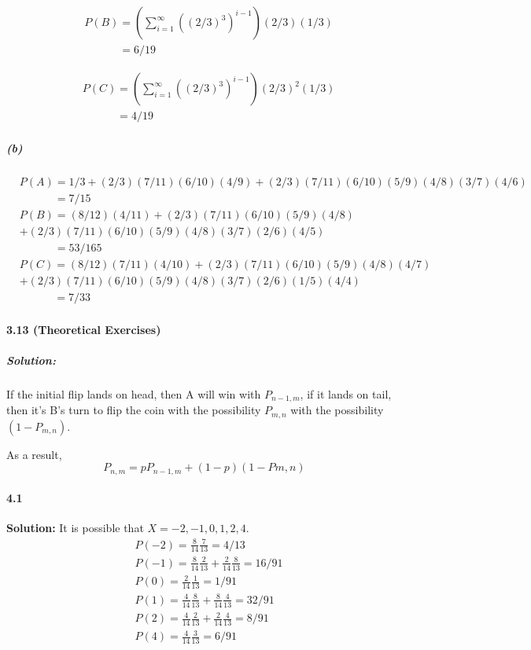 \documentclass[11pt]{article}
\begin{document}
			\begin{align}
				&P(B) = (\sum_{i = 1}^\infty ((2/3)^3)^{i - 1})(2/3)(1/3)\nonumber\\
				&\phantom{P(B)} = 6/19\nonumber
			\end{align}
			
			\begin{align}
				&P(C) = 	(\sum_{i = 1}^\infty ((2/3)^3)^{i - 1})(2/3)^2(1/3)\nonumber\\
				&\phantom{P(C)} = 4/19\nonumber
			\end{align}

		\subparagraph{(b)}
			\begin{align}
				&P(A) = 1/3 + (2/3)(7/11)(6/10)(4/9) + (2/3)(7/11)(6/10)(5/9)(4/8)(3/7)(4/6)\nonumber\\
				&\phantom{P(A)} = 7/15\nonumber\\
				&P(B) = (8/12)(4/11) + (2/3)(7/11)(6/10)(5/9)(4/8)\nonumber\\
				&+ (2/3)(7/11)(6/10)(5/9)(4/8)(3/7)(2/6)(4/5)\nonumber\\
				&\phantom{P(B)} = 53/165\nonumber\\
				&P(C) = (8/12)(7/11)(4/10) + (2/3)(7/11)(6/10)(5/9)(4/8)(4/7)\nonumber\\
				& + (2/3)(7/11)(6/10)(5/9)(4/8)(3/7)(2/6)(1/5)(4/4)\nonumber\\
				&\phantom{P(C)} = 7/33\nonumber
			\end{align}
	\paragraph{3.13 (Theoretical Exercises)}
		\subparagraph{Solution:}
			If the initial flip lands on head, then A will win with $P_{n - 1, m}$, if it lands on tail, then it's B's turn to flip the coin with the possibility $P_{m , n}$ with the possibility $(1 - P_{m , n})$.
			
			As a result, \[P_{n,m} = pP_{n-1, m} + (1-p)(1-P{m,n})\]
	\paragraph{4.1}\textbf{Solution:}
	It is possible that $X = -2, -1, 0, 1, 2, 4$.
		\begin{align}
			&P(-2) = \frac{8}{14}\frac{7}{13} = 4/13\nonumber\\
			&P(-1) = \frac{8}{14}\frac{2}{13} + \frac{2}{14}\frac{8}{13} = 16/91\nonumber\\
			&P(0) = \frac{2}{14}\frac{1}{13} = 1/91\nonumber\\
			&P(1) = \frac{4}{14}\frac{8}{13} + \frac{8}{14}\frac{4}{13} = 32/91\nonumber\\
			&P(2) = \frac{4}{14}\frac{2}{13} + \frac{2}{14}\frac{4}{13} = 8/91\nonumber\\
			&P(4) = \frac{4}{14}\frac{3}{13} = 6/91\nonumber
		\end{align}
\end{document}
